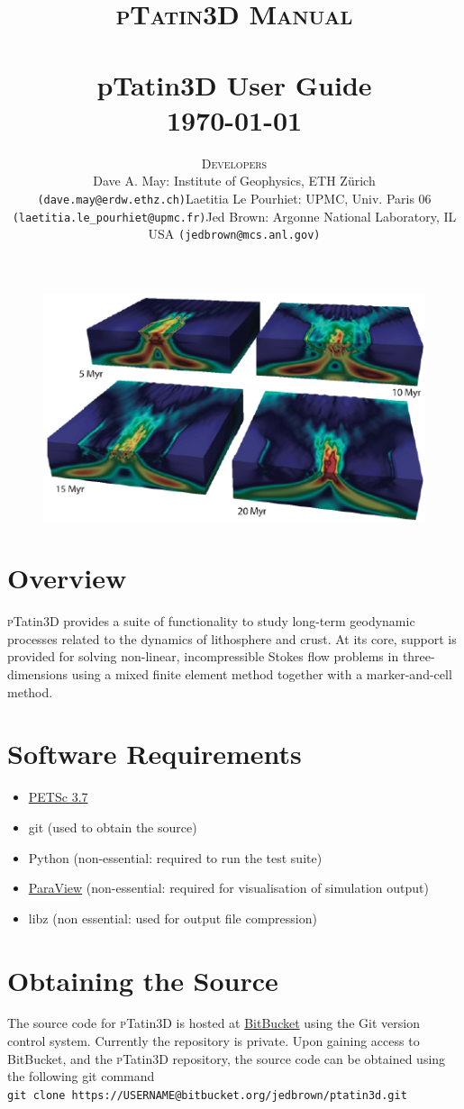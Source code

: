 \documentclass[paper=a4, fontsize=11pt,twoside]{scrartcl}
\title{	\normalsize \textsc{pTatin3D Manual} 	%
	\\[2.0cm]									%
	\HRule{2pt} \\ [0.3cm]						%
	\LARGE \textbf{{pTatin3D User Guide}}			%
	\HRule{2pt} \\ [0.5cm]						%
	\normalsize \today							%
	}
\author{
{\normalsize \textsc{Developers}}
\begin{itemize}
\item[-] Dave A. May: Institute of Geophysics, ETH Z{\"u}rich \texttt{(dave.may@erdw.ethz.ch)} 
\item[-] Laetitia Le Pourhiet: UPMC, Univ. Paris 06  \texttt{(laetitia.le\_pourhiet@upmc.fr)}
\item[-] Jed Brown: Argonne National Laboratory, IL USA  \texttt{(jedbrown@mcs.anl.gov)}
\end{itemize}
}
\makeatletter
\newcommand{\ptat}{{{\textsc pTatin3D}}}
\newcommand{\shellcmd}[1]{\\\indent\indent\texttt{\hspace{5mm}\footnotesize #1}\\}
\def\printtitle{%
    {
    	\centering \@title\par}
		 	\vspace{10mm}
	\begin{figure} [hbtp]
	\includegraphics[height=0.4\textheight]{figs/ptat3d_front_page_small.pdf}
	\end{figure}
    }
\def\printauthor{%
    {\centering \large \@author}}
\makeatother
\begin{document}
\thispagestyle{empty}%

\printtitle%
  	\vfill
\printauthor%




\newpage
{}
\tableofcontents{}

\newpage


\section{Overview}
{\ptat} provides a suite of functionality to study long-term geodynamic processes related to the dynamics of lithosphere and crust.
At its core, support is provided for solving non-linear, incompressible Stokes flow problems in three-dimensions using a mixed finite element method together with a marker-and-cell method.




\newpage
\section{Software Requirements}
\begin{itemize}
	\item \href{http://www.mcs.anl.gov/petsc}{PETSc 3.7}
	\item git (used to obtain the source)
	\item Python (non-essential: required to run the test suite)
	\item \href{www.paraview.org}{ParaView} (non-essential: required for visualisation of simulation output)
	\item libz (non essential: used for output file compression)
\end{itemize}

\section{Obtaining the Source}
The source code for {\ptat} is hosted at \href{https://bitbucket.org}{BitBucket} using the Git version control system.
Currently the repository is private. Upon gaining access to BitBucket, and the {\ptat} repository,
the source code can be obtained using the following git command
\shellcmd{git clone https://USERNAME@bitbucket.org/jedbrown/ptatin3d.git}
\end{document}
